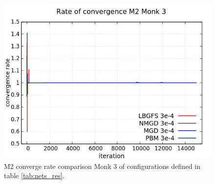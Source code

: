 \begin{figure}[H]
	\centering
	\includegraphics[width=0.6\linewidth]{data/Comparison/Monk3/Monk3_M2_CR_standard.png}
	\caption{M2 converge rate comparison Monk 3 of configurations defined in table \ref{tab:nets_res}.}
	\label{fig:CR-M2-Monk3-Standard}
\end{figure}

